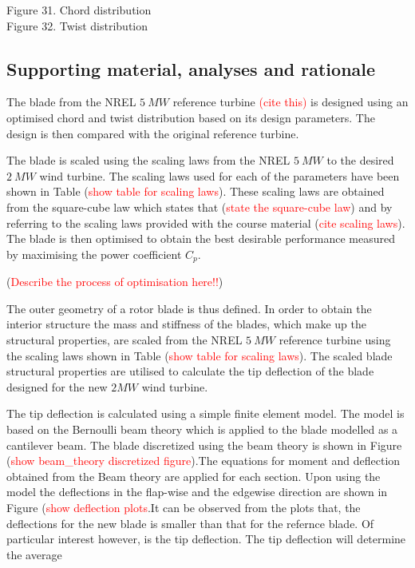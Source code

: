 Figure 31. Chord distribution\\

Figure 32. Twist distribution\\

\subsection{Supporting material, analyses and rationale}
The blade from the NREL $5\ MW$ reference turbine \textcolor{red}{(cite this)} is designed using an optimised chord and twist distribution based on its design parameters. The design is then compared with the original reference turbine.

The blade is scaled using the scaling laws from the NREL $5\ MW$ to the desired $2\ MW$ wind turbine. The scaling laws used for each of the parameters have been shown in Table (\textcolor{red}{show table for scaling laws}). These scaling laws are obtained from the square-cube law which states that (\textcolor{red}{state the square-cube law}) and by referring to the scaling laws provided with the course material (\textcolor{red}{cite scaling laws}). The blade is then optimised to obtain the best desirable performance measured by maximising the power coefficient $C_p$.

(\textcolor{red}{Describe the process of optimisation here!!})

The outer geometry of a rotor blade is thus defined. In order to obtain the interior structure the mass and stiffness of the blades, which make up the structural properties, are scaled from the NREL $5\ MW$ reference turbine using the scaling laws shown in Table (\textcolor{red}{show table for scaling laws}). The scaled blade structural properties are utilised to calculate the tip deflection of the blade designed for the new $2 MW$ wind turbine. 

The tip deflection is calculated using a simple finite element model. The model is based on the Bernoulli beam theory which is applied to the blade modelled as a cantilever beam. The blade discretized using the beam theory is shown in Figure (\textcolor{red}{show beam_theory discretized figure}).The equations for moment and deflection obtained from the Beam theory are applied for each section. Upon using the model the deflections in the flap-wise and the edgewise direction are shown in Figure (\textcolor{red}{show deflection plots}.It can be observed from the plots that, the deflections for the new blade is smaller than that for the refernce blade. Of particular interest however, is the tip deflection. The tip deflection will determine the average

